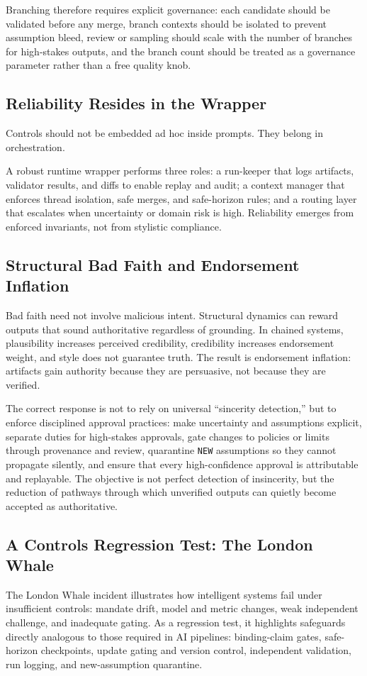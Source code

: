 Branching therefore requires explicit governance: each candidate should be validated before any merge, branch contexts should be isolated to prevent assumption bleed, review or sampling should scale with the number of branches for high-stakes outputs, and the branch count should be treated as a governance parameter rather than a free quality knob. 

\subsection{Reliability Resides in the Wrapper}
Controls should not be embedded ad hoc inside prompts. They belong in orchestration.

A robust runtime wrapper performs three roles: a run-keeper that logs artifacts, validator results, and diffs to enable replay and audit; a context manager that enforces thread isolation, safe merges, and safe-horizon rules; and a routing layer that escalates when uncertainty or domain risk is high. Reliability emerges from enforced invariants, not from stylistic compliance. 

\subsection{Structural Bad Faith and Endorsement Inflation}
Bad faith need not involve malicious intent. Structural dynamics can reward outputs that sound authoritative regardless of grounding. In chained systems, plausibility increases perceived credibility, credibility increases endorsement weight, and style does not guarantee truth. The result is endorsement inflation: artifacts gain authority because they are persuasive, not because they are verified.

The correct response is not to rely on universal ``sincerity detection,'' but to enforce disciplined approval practices: make uncertainty and assumptions explicit, separate duties for high-stakes approvals, gate changes to policies or limits through provenance and review, quarantine \texttt{NEW} assumptions so they cannot propagate silently, and ensure that every high-confidence approval is attributable and replayable. The objective is not perfect detection of insincerity, but the reduction of pathways through which unverified outputs can quietly become accepted as authoritative. 

\subsection{A Controls Regression Test: The London Whale}
The London Whale incident illustrates how intelligent systems fail under insufficient controls: mandate drift, model and metric changes, weak independent challenge, and inadequate gating. As a regression test, it highlights safeguards directly analogous to those required in AI pipelines: binding-claim gates, safe-horizon checkpoints, update gating and version control, independent validation, run logging, and new-assumption quarantine.

